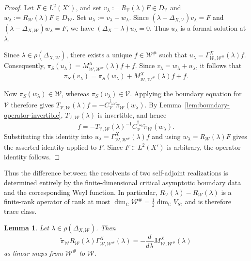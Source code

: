 \documentclass[12pt]{amsart}
\theoremstyle{plain}
\newtheorem{lem}[thm]{Lemma}
\theoremstyle{definition}
\theoremstyle{remark}
\numberwithin{equation}{section} \numberwithin{figure}{section}
\newcommand{\mb}[1]{\mathbb{#1}} %
\begin{document}
\begin{proof}
Let \(F\in L^2(X')\), and set
\(v_\lambda:=R_{\mathcal V}(\lambda)F\in D_{\mathcal V}\) and
\(w_\lambda:=R_{\mathcal W}(\lambda)F\in D_{\mathcal W}\).
Set \(u_\lambda:=v_\lambda-w_\lambda\). Since
\((\lambda-\Delta_{X,\mathcal V})v_\lambda=F\) and
\((\lambda-\Delta_{X,\mathcal W})w_\lambda=F\), we have
\((\Delta_X-\lambda)u_\lambda=0\). Thus \(u_\lambda\) is a formal
solution at \(\lambda\).

Since \(\lambda\in\rho(\Delta_{X,\mathcal W})\), there exists a
unique \(f\in\mathcal W^\#\) such that
\(
u_\lambda
=
\Gamma_{\mathcal W,\mathcal W^\#}^{X}(\lambda)f.
\)
Consequently,
\(
\pi_S(u_\lambda)
=
M_{\mathcal W,\mathcal W^\#}^{X}(\lambda)f+f.
\)
Since \(v_\lambda=w_\lambda+u_\lambda\), it follows that
\[
\pi_S(v_\lambda)
=
\pi_S(w_\lambda)
+
M_{\mathcal W,\mathcal W^\#}^{X}(\lambda)f
+
f.
\]

Now \(\pi_S(w_\lambda)\in\mathcal W\), whereas
\(\pi_S(v_\lambda)\in\mathcal V\). Applying the boundary equation
for \(\mathcal V\) therefore gives
\(
T_{\mathcal V,\mathcal W}(\lambda)f
=
-C_{\mathcal V}^{\dagger_{\omega_S}}
\widetilde{\pi}_{\mathcal W}(w_\lambda).
\)
By Lemma~\ref{lem:boundary-operator-invertible},
\(T_{\mathcal V,\mathcal W}(\lambda)\) is invertible, and hence
\[
f
=
-T_{\mathcal V,\mathcal W}(\lambda)^{-1}
C_{\mathcal V}^{\dagger_{\omega_S}}
\widetilde{\pi}_{\mathcal W}(w_\lambda).
\]
Substituting this identity into
\(
u_\lambda
=
\Gamma_{\mathcal W,\mathcal W^\#}^{X}(\lambda)f
\)
and using \(w_\lambda=R_{\mathcal W}(\lambda)F\) gives the asserted
identity applied to \(F\). Since \(F\in L^2(X')\) is arbitrary, the
operator identity follows.
\end{proof}


Thus the difference between the resolvents of two self-adjoint
realizations is determined entirely by the finite-dimensional
critical asymptotic boundary data and the corresponding Weyl
function. In particular,
\(R_{\mathcal V}(\lambda)-R_{\mathcal W}(\lambda)\) is a
finite-rank operator of rank at most
\(\dim_{\mb C}\mathcal W^\#
=\frac12\dim_{\mb C}V_S\), and is therefore trace class.

\begin{lem}\label{lem:boundary-resolvent-M-derivative}
Let \(\lambda\in\rho(\Delta_{X,\mathcal W})\). Then
\[
\widetilde{\pi}_{\mathcal W}
R_{\mathcal W}(\lambda)
\Gamma_{\mathcal W,\mathcal W^\#}^{X}(\lambda)
=
-\frac{d}{d\lambda}
M_{\mathcal W,\mathcal W^\#}^{X}(\lambda)
\]
as linear maps from \(\mathcal W^\#\) to \(\mathcal W\).
\end{lem}
\end{document}
